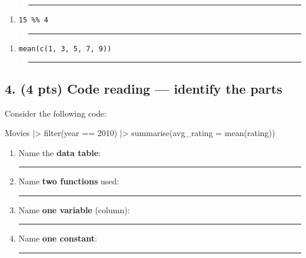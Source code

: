 \documentclass[
  11pt,
  letterpaper,
  DIV=11,
  numbers=noendperiod]{scrartcl}
\newenvironment{Shaded}{\begin{snugshade}}{\end{snugshade}}
\newcommand{\AttributeTok}[1]{\textcolor[rgb]{0.40,0.45,0.13}{#1}}
\newcommand{\DecValTok}[1]{\textcolor[rgb]{0.68,0.00,0.00}{#1}}
\newcommand{\FunctionTok}[1]{\textcolor[rgb]{0.28,0.35,0.67}{#1}}
\newcommand{\NormalTok}[1]{\textcolor[rgb]{0.00,0.23,0.31}{#1}}
\newcommand{\SpecialCharTok}[1]{\textcolor[rgb]{0.37,0.37,0.37}{#1}}
\providecommand{\tightlist}{%
  \setlength{\itemsep}{0pt}\setlength{\parskip}{0pt}}
\begin{document}
\begin{quote}
\rule{4in}{0.4pt}
\end{quote}

\vspace{0.5em}

\begin{enumerate}
\def\labelenumi{(\alph{enumi})}
\setcounter{enumi}{2}
\tightlist
\item \texttt{15\ \%\%\ 4}
\end{enumerate}

\begin{quote}
\rule{4in}{0.4pt}
\end{quote}

\vspace{0.5em}

\begin{enumerate}
\def\labelenumi{(\alph{enumi})}
\setcounter{enumi}{3}
\tightlist
\item \texttt{mean(c(1,\ 3,\ 5,\ 7,\ 9))}
\end{enumerate}

\begin{quote}
\rule{4in}{0.4pt}
\end{quote}

\vspace{0.5em}

\newpage

\subsection{4. (4 pts) Code reading --- identify the parts}

Consider the following code:

\begin{Shaded}
\begin{Highlighting}[]
\NormalTok{Movies }\SpecialCharTok{|\textgreater{}}
  \FunctionTok{filter}\NormalTok{(year }\SpecialCharTok{==} \DecValTok{2010}\NormalTok{) }\SpecialCharTok{|\textgreater{}}
  \FunctionTok{summarise}\NormalTok{(}\AttributeTok{avg\_rating =} \FunctionTok{mean}\NormalTok{(rating))}
\end{Highlighting}
\end{Shaded}

\vspace{0.25em}

\begin{enumerate}
\def\labelenumi{(\alph{enumi})}
\item Name the \textbf{data table}:

  \rule{2in}{0.4pt}
\item Name \textbf{two functions} used:

  \rule{2.5in}{0.4pt}
\item Name \textbf{one variable} (column):

  \rule{2in}{0.4pt}
\item Name \textbf{one constant}:

  \rule{2in}{0.4pt}
\end{enumerate}
\end{document}
